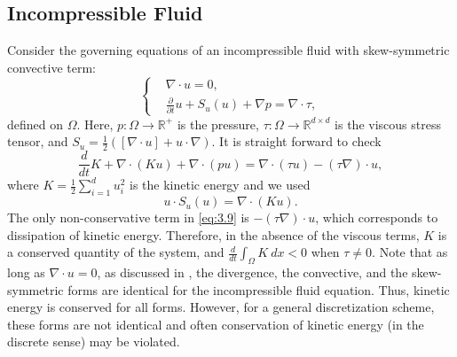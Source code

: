 \subsection{Incompressible Fluid} \label{sec:skew.2}
Consider the governing equations of an incompressible fluid with skew-symmetric convective term:
\begin{equation} \label{eq:3.8}
	\left\{
	\begin{aligned}
	&\nabla \cdot u = 0, \\
	&\frac{\partial}{\partial t} u + S_{u}(u) + \nabla p = \nabla \cdot \tau,
	\end{aligned}
	\right.
\end{equation}
defined on $\Omega$. Here, $p: \Omega \to \mathbb R^+$ is the pressure, $\tau: \Omega \to \mathbb R^{d\times d}$ is the viscous stress tensor, and $S_u = \frac 1 2 ([ \nabla \cdot u] + u\cdot \nabla)$. It is straight forward to check
\begin{equation} \label{eq:3.9}
	\frac{d}{dt} K + \nabla \cdot (Ku) + \nabla \cdot (pu)= \nabla \cdot (\tau u) - (\tau \nabla)\cdot u,
\end{equation}
where $K = \frac 1 2 \sum_{i=1}^d u_i^2 $ is the kinetic energy and we used 
\begin{equation} \label{eq:3.11}
	u\cdot S_{u}(u) = \nabla \cdot(Ku).
\end{equation}
The only non-conservative term in \eqref{eq:3.9} is $-(\tau \nabla)\cdot u$, which corresponds to dissipation of kinetic energy. Therefore, in the absence of the viscous terms, $K$ is a conserved quantity of the system, and $\frac d {dt} \int_{\Omega} K \ dx <0$ when $\tau\neq 0$. Note that as long as $\nabla \cdot u = 0$, as discussed in , the divergence, the convective, and the skew-symmetric forms are identical for the incompressible fluid equation. Thus, kinetic energy is conserved for all forms. However, for a general discretization scheme, these forms are not identical and often conservation of kinetic energy (in the discrete sense) may be violated.

